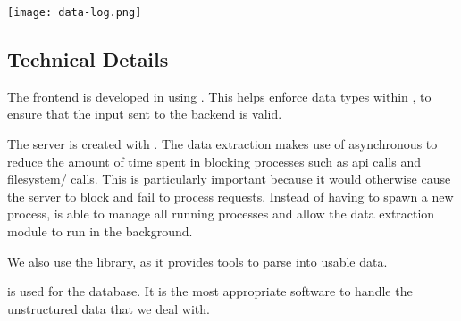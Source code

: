 \begin{center}
    \texttt{[image: data-log.png]}
\end{center}

\subsection{Technical Details}
The frontend is developed in  using . This helps enforce data types within , to ensure that the input sent to the backend is valid.

The server is created with . The data extraction makes use of asynchronous  to reduce the amount of time spent in blocking processes such as api calls and filesystem/ calls. This is particularly important because it would otherwise cause the server to block and fail to process requests. Instead of having to spawn a new process,  is able to manage all running processes and allow the data extraction module to run in the background.

We also use the  library, as it provides tools to parse  into usable data.

 is used for the database. It is the most appropriate software to handle the unstructured data that we deal with.

\newpage
